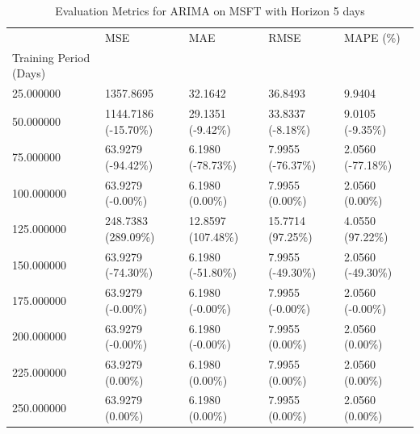 \begin{table}
\caption{Evaluation Metrics for ARIMA on MSFT with Horizon 5 days}
\label{tab:arima_MSFT_h5_metrics}
\begin{tabular}{lllll}
\toprule
 & MSE & MAE & RMSE & MAPE (\%) \\
Training Period (Days) &  &  &  &  \\
\midrule
25.000000 & 1357.8695 & 32.1642 & 36.8493 & 9.9404 \\
50.000000 & 1144.7186 (-15.70\%) & 29.1351 (-9.42\%) & 33.8337 (-8.18\%) & 9.0105 (-9.35\%) \\
75.000000 & 63.9279 (-94.42\%) & 6.1980 (-78.73\%) & 7.9955 (-76.37\%) & 2.0560 (-77.18\%) \\
100.000000 & 63.9279 (-0.00\%) & 6.1980 (0.00\%) & 7.9955 (0.00\%) & 2.0560 (0.00\%) \\
125.000000 & 248.7383 (289.09\%) & 12.8597 (107.48\%) & 15.7714 (97.25\%) & 4.0550 (97.22\%) \\
150.000000 & 63.9279 (-74.30\%) & 6.1980 (-51.80\%) & 7.9955 (-49.30\%) & 2.0560 (-49.30\%) \\
175.000000 & 63.9279 (-0.00\%) & 6.1980 (-0.00\%) & 7.9955 (-0.00\%) & 2.0560 (-0.00\%) \\
200.000000 & 63.9279 (-0.00\%) & 6.1980 (-0.00\%) & 7.9955 (0.00\%) & 2.0560 (0.00\%) \\
225.000000 & 63.9279 (0.00\%) & 6.1980 (0.00\%) & 7.9955 (0.00\%) & 2.0560 (0.00\%) \\
250.000000 & 63.9279 (0.00\%) & 6.1980 (0.00\%) & 7.9955 (0.00\%) & 2.0560 (0.00\%) \\
\bottomrule
\end{tabular}
\end{table}
